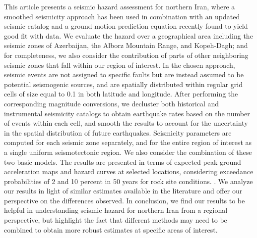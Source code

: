 % 
This article presents a seismic hazard assessment for northern Iran, where a smoothed seismicity approach has been used in combination with an updated seismic catalog and a ground motion prediction equation recently found to yield good fit with data. We evaluate the hazard over a geographical area including the seismic zones of Azerbaijan, the Alborz Mountain Range, and Kopeh-Dagh; and for completeness, we also consider the contribution of parts of other neighboring seismic zones that fall within our region of interest. In the chosen approach, seismic events are not assigned to specific faults but are instead assumed to be potential seismogenic sources, and are spatially distributed within regular grid cells of size equal to 0.1\textdegree{} in both latitude and longitude. After performing the corresponding magnitude conversions, we decluster both historical and instrumental seismicity catalogs to obtain earthquake rates based on the number of events within each cell, and smooth the results to account for the uncertainty in the spatial distribution of future earthquakes. Seismicity parameters are computed for each seismic zone separately, and for the entire region of interest as a single uniform seismotectonic region. We also consider the combination of these two basic models. The results are presented in terms of expected peak ground acceleration maps and hazard curves at selected locations, considering exceedance probabilities of 2 and 10 percent in 50 years for rock site conditions. . We analyze our results in light of similar estimates available in the literature and offer our perspective on the differences observed. In conclusion, we find our results to be helpful in understanding seismic hazard for northern Iran from a regional perspective, but highlight the fact that different methods may need to be combined to obtain more robust estimates at specific areas of interest.

